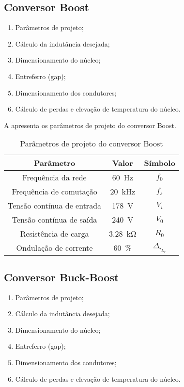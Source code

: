 \subsection{Conversor Boost}
\begin{enumerate}	
	\item Parâmetros de projeto; 	
	\item Cálculo da indutância desejada;	
	\item Dimensionamento do núcleo;	
	\item Entreferro (gap);
	\item  Dimensionamento dos condutores;
	\item Cálculo de perdas e elevação de temperatura do núcleo.
\end{enumerate}

A  apresenta os parâmetros de projeto do conversor Boost.
\begin{table}[!ht]
	\centering
	\caption{Parâmetros de projeto do conversor Boost}
	\label{tab:parametrosBoost}
	\begin{tabular}{@{}ccc@{}}
		\toprule
		\textbf{Parâmetro} & \textbf{Valor} & \textbf{Símbolo} \\ \midrule			
		Frequência  da rede        & \SI{60}{\hertz}     & $f_0$  \\		
		Frequência de comutação        & \SI{20}{\kilo\hertz}     & $f_s$  \\	
		Tensão contínua de entrada         &  \SI{178}{\V}      & $V_i$  \\
		Tensão contínua de saída         &  \SI{240}{\V}      & $V_0$  \\
		Resistência de carga        & \SI{3.28}{\kilo\ohm}      & $R_0$  \\
		Ondulação de corrente       & \SI{60}{\%}    & $\Delta_{i_{L_0}}$    \\  \bottomrule	
	\end{tabular}
\end{table}


\subsection{Conversor Buck-Boost}
\begin{enumerate}	
	\item Parâmetros de projeto; 	
	\item Cálculo da indutância desejada;	
	\item Dimensionamento do núcleo;	
	\item Entreferro (gap);
	\item  Dimensionamento dos condutores;
	\item Cálculo de perdas e elevação de temperatura do núcleo.
\end{enumerate}

